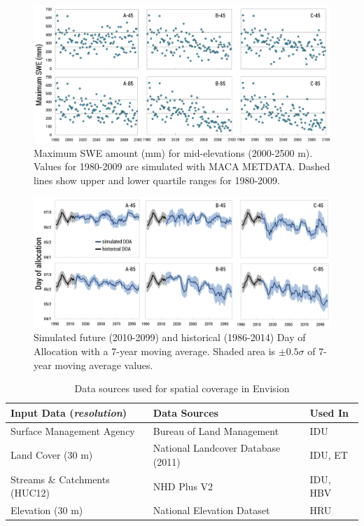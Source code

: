 \documentclass[water,article,submit,moreauthors,pdftex,10pt,a4paper]{mdpi}
\theoremstyle{mdpi}
\newcounter{ex}
\newcounter{re}
\theoremstyle{mdpidefinition}
\begin{document}
\begin{figure}
\centering
\includegraphics[width=\textwidth]{figure-files/figure14.png}
\caption{Maximum SWE amount (mm) for mid-elevations (2000-2500 m). Values for 1980-2009 are simulated with MACA METDATA. Dashed lines show upper and lower quartile ranges for 1980-2009.}
\label{fig:MaxSWEMidElev}
\end{figure}
\clearpage

\begin{figure}
\centering
\includegraphics[width=\textwidth]{figure-files/figure15.png}
\caption{Simulated future (2010-2099) and historical (1986-2014) Day of Allocation with a 7-year moving average. Shaded area is $\pm 0.5\sigma$ of 7-year moving average values.}
\label{fig:FutureDayOfAllocation}
\end{figure}
\clearpage

%
%
%
%
\begin{table}
\caption{Data sources used for spatial coverage in Envision}
\label{table:DataSources}
\centering
\begin{tabular}{l l l}
\hline\hline
Input Data (\textit{resolution}) & Data Sources & Used In\\
\hline
Surface Management Agency & Bureau of Land Management & IDU \\
Land Cover (30 m) & National Landcover Database (2011) & IDU, ET \\
Streams \& Catchments (HUC12) & NHD Plus V2 & IDU, HBV \\
Elevation (30 m) & National Elevation Dataset & HRU \\
\hline\hline
\end{tabular}
\end{table}
\clearpage
\end{document}
